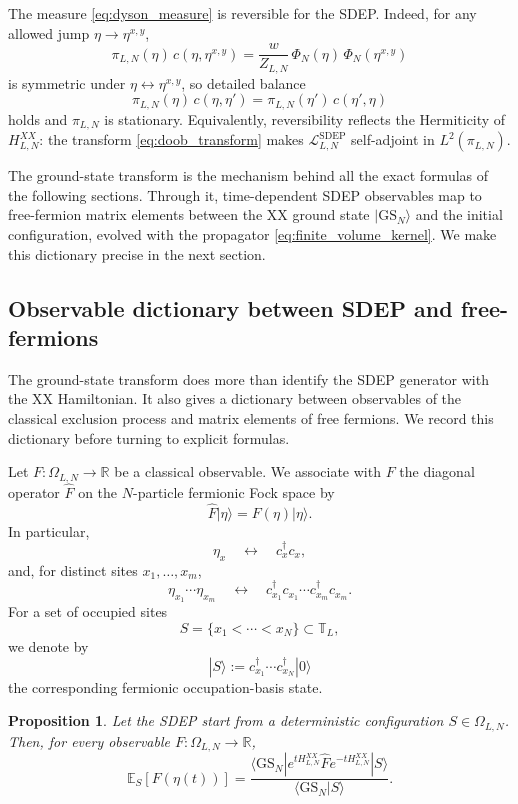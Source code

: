 \documentclass[11pt]{article}
\numberwithin{equation}{section}
\newtheorem{proposition}[theorem]{Proposition}
\newcommand{\1}{\mathbf 1}
\begin{document}
The measure \eqref{eq:dyson_measure} is reversible for the SDEP.  Indeed, for any
allowed jump \(\eta\to\eta^{x,y}\),
\[
    \pi_{L,N}(\eta)\,c(\eta,\eta^{x,y})
    =
    \frac{w}{Z_{L,N}}\,\Phi_N(\eta)\,\Phi_N(\eta^{x,y})
\]
is symmetric under \(\eta\leftrightarrow\eta^{x,y}\), so detailed balance
\begin{equation}
    \pi_{L,N}(\eta)\,c(\eta,\eta')
    =
    \pi_{L,N}(\eta')\,c(\eta',\eta)
    \label{eq:detailed_balance}
\end{equation}
holds and \(\pi_{L,N}\) is stationary.  Equivalently, reversibility reflects the
Hermiticity of \(H_{L,N}^{XX}\): the transform \eqref{eq:doob_transform} makes
\(\mathcal L_{L,N}^{\mathrm{SDEP}}\) self-adjoint in \(L^2(\pi_{L,N})\).

The ground-state transform is the mechanism behind all the exact formulas of the
following sections.  Through it, time-dependent SDEP observables map to
free-fermion matrix elements between the XX ground state
\(|\mathrm{GS}_N\rangle\) and the initial configuration, evolved with the
propagator \eqref{eq:finite_volume_kernel}.  We make this dictionary precise in
the next section.

\subsection{ Observable dictionary between SDEP and free-fermions}
\label{sec:observable_dictionary}

The ground-state transform does more than identify the SDEP generator with the
XX Hamiltonian.  It also gives a dictionary between observables of the classical
exclusion process and matrix elements of free fermions.  We record this
dictionary before turning to explicit formulas.

Let \(F:\Omega_{L,N}\to\mathbb R\) be a classical observable.  We associate with
\(F\) the diagonal operator \(\widehat F\) on the \(N\)-particle fermionic Fock
space by
\[
    \widehat F|\eta\rangle=F(\eta)|\eta\rangle .
\]
In particular,
\[
    \eta_x
    \quad\longleftrightarrow\quad
    c_x^\dagger c_x,
\]
and, for distinct sites \(x_1,\ldots,x_m\),
\[
    \eta_{x_1}\cdots \eta_{x_m}
    \quad\longleftrightarrow\quad
    c_{x_1}^\dagger c_{x_1}\cdots
    c_{x_m}^\dagger c_{x_m}.
\]
For a set of occupied sites
\[
    S=\{x_1<\cdots<x_N\}\subset\mathbb T_L,
\]
we denote by
\[
    |S\rangle
    :=
    c_{x_1}^\dagger\cdots c_{x_N}^\dagger|0\rangle
\]
the corresponding fermionic occupation-basis state.
\begin{proposition}
\label{prop:observable_dictionary}
Let the SDEP start from a deterministic configuration
\(S\in\Omega_{L,N}\).  Then, for every observable
\(F:\Omega_{L,N}\to\mathbb R\),
\begin{equation}
    \mathbb E_S[F(\eta(t))]
    =
    \frac{
    \langle \mathrm{GS}_N|
    e^{tH^{XX}_{L,N}}
    \widehat F
    e^{-tH^{XX}_{L,N}}
    |S\rangle
    }{
    \langle \mathrm{GS}_N|S\rangle
    }.
    \label{eq:observable_dictionary}
\end{equation}
\end{proposition}
\end{document}
